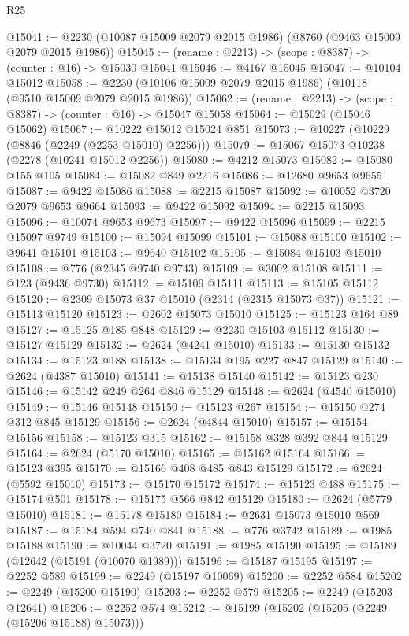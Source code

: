 \begin{lexlean}{R25}
\begin{coremodule}
@15041 := @2230 (@10087 @15009 @2079 @2015 @1986) (@8760 (@9463 @15009 @2079 @2015 @1986))
@15045 := (rename : @2213) -> (scope : @8387) -> (counter : @16) -> @15030 @15041
@15046 := @4167 @15045
@15047 := @10104 @15012
@15058 := @2230 (@10106 @15009 @2079 @2015 @1986) (@10118 (@9510 @15009 @2079 @2015 @1986))
@15062 := (rename : @2213) -> (scope : @8387) -> (counter : @16) -> @15047 @15058
@15064 := @15029 (@15046 @15062)
@15067 := @10222 @15012 @15024 @851
@15073 := @10227 (@10229 (@8846 (@2249 (@2253 @15010) @2256)))
@15079 := @15067 @15073 @10238 (@2278 (@10241 @15012 @2256))
@15080 := @4212 @15073
@15082 := @15080 @155 @105
@15084 := @15082 @849 @2216
@15086 := @12680 @9653 @9655
@15087 := @9422 @15086
@15088 := @2215 @15087
@15092 := @10052 @3720 @2079 @9653 @9664
@15093 := @9422 @15092
@15094 := @2215 @15093
@15096 := @10074 @9653 @9673
@15097 := @9422 @15096
@15099 := @2215 @15097 @9749
@15100 := @15094 @15099
@15101 := @15088 @15100
@15102 := @9641 @15101
@15103 := @9640 @15102
@15105 := @15084 @15103 @15010
@15108 := @776 (@2345 @9740 @9743)
@15109 := @3002 @15108
@15111 := @123 (@9436 @9730)
@15112 := @15109 @15111
@15113 := @15105 @15112
@15120 := @2309 @15073 @37 @15010 (@2314 (@2315 @15073 @37))
@15121 := @15113 @15120
@15123 := @2602 @15073 @15010
@15125 := @15123 @164 @89
@15127 := @15125 @185 @848
@15129 := @2230 @15103 @15112
@15130 := @15127 @15129
@15132 := @2624 (@4241 @15010)
@15133 := @15130 @15132
@15134 := @15123 @188
@15138 := @15134 @195 @227 @847 @15129
@15140 := @2624 (@4387 @15010)
@15141 := @15138 @15140
@15142 := @15123 @230
@15146 := @15142 @249 @264 @846 @15129
@15148 := @2624 (@4540 @15010)
@15149 := @15146 @15148
@15150 := @15123 @267
@15154 := @15150 @274 @312 @845 @15129
@15156 := @2624 (@4844 @15010)
@15157 := @15154 @15156
@15158 := @15123 @315
@15162 := @15158 @328 @392 @844 @15129
@15164 := @2624 (@5170 @15010)
@15165 := @15162 @15164
@15166 := @15123 @395
@15170 := @15166 @408 @485 @843 @15129
@15172 := @2624 (@5592 @15010)
@15173 := @15170 @15172
@15174 := @15123 @488
@15175 := @15174 @501
@15178 := @15175 @566 @842 @15129
@15180 := @2624 (@5779 @15010)
@15181 := @15178 @15180
@15184 := @2631 @15073 @15010 @569
@15187 := @15184 @594 @740 @841
@15188 := @776 @3742
@15189 := @1985 @15188
@15190 := @10044 @3720
@15191 := @1985 @15190
@15195 := @15189 (@12642 (@15191 (@10070 @1989)))
@15196 := @15187 @15195
@15197 := @2252 @589
@15199 := @2249 (@15197 @10069)
@15200 := @2252 @584
@15202 := @2249 (@15200 @15190)
@15203 := @2252 @579
@15205 := @2249 (@15203 @12641)
@15206 := @2252 @574
@15212 := @15199 (@15202 (@15205 (@2249 (@15206 @15188) @15073)))

\end{coremodule}
\end{lexlean}
